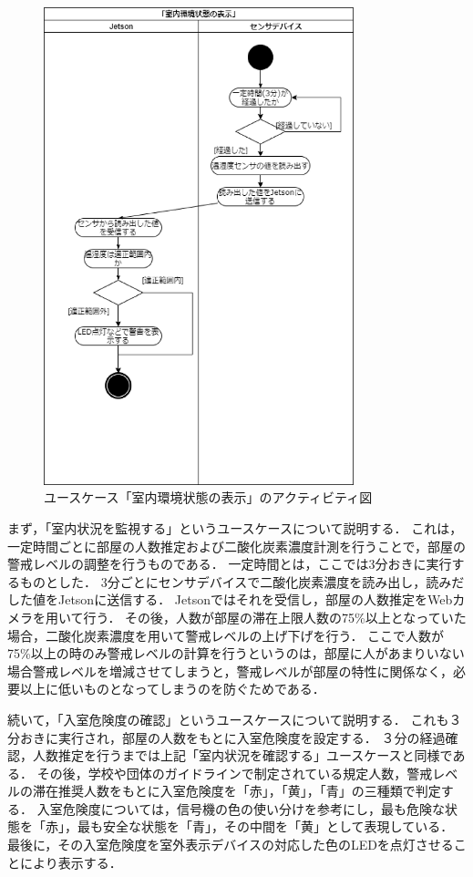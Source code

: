 \begin{figure}[htbp]
    \centering
    \includegraphics[width = 9cm]{./picture/activity_kankyou_2.eps}
    \caption{ユースケース「室内環境状態の表示」のアクティビティ図}
    \label{act_kankyou}
\end{figure}

まず，「室内状況を監視する」というユースケースについて説明する．
これは，一定時間ごとに部屋の人数推定および二酸化炭素濃度計測を行うことで，部屋の警戒レベルの調整を行うものである．
一定時間とは，ここでは3分おきに実行するものとした．
3分ごとにセンサデバイスで二酸化炭素濃度を読み出し，読みだした値をJetsonに送信する．
Jetsonではそれを受信し，部屋の人数推定をWebカメラを用いて行う．
その後，人数が部屋の滞在上限人数の75\%以上となっていた場合，二酸化炭素濃度を用いて警戒レベルの上げ下げを行う．
ここで人数が75\%以上の時のみ警戒レベルの計算を行うというのは，部屋に人があまりいない場合警戒レベルを増減させてしまうと，警戒レベルが部屋の特性に関係なく，必要以上に低いものとなってしまうのを防ぐためである．

続いて，「入室危険度の確認」というユースケースについて説明する．
これも３分おきに実行され，部屋の人数をもとに入室危険度を設定する．
３分の経過確認，人数推定を行うまでは上記「室内状況を確認する」ユースケースと同様である．
その後，学校や団体のガイドラインで制定されている規定人数，警戒レベルの滞在推奨人数をもとに入室危険度を「赤」，「黄」，「青」の三種類で判定する．
入室危険度については，信号機の色の使い分けを参考にし，最も危険な状態を「赤」，最も安全な状態を「青」，その中間を「黄」として表現している．
最後に，その入室危険度を室外表示デバイスの対応した色のLEDを点灯させることにより表示する．

